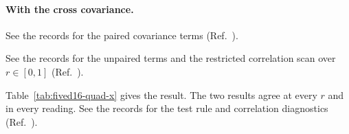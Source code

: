 \paragraph{With the cross covariance.} See the records for the paired covariance terms (Ref.~\cite{NoteRecords2026}).

See the records for the unpaired terms and the restricted correlation scan over $r\in[0,1]$ (Ref.~\cite{NoteRecords2026}).

 Table~\ref{tab:fived16-quad-x} gives the result. The two results agree at every $r$ and in every reading. See the records for the test rule and correlation diagnostics (Ref.~\cite{NoteRecords2026}).

